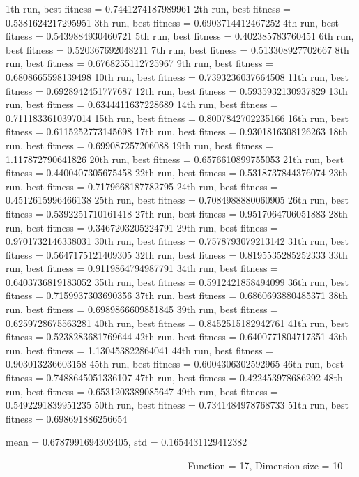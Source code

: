 1th run, best fitness = 0.7441274187989961
2th run, best fitness = 0.5381624217295951
3th run, best fitness = 0.6903714412467252
4th run, best fitness = 0.5439884930460721
5th run, best fitness = 0.402385783760451
6th run, best fitness = 0.520367692048211
7th run, best fitness = 0.513308927702667
8th run, best fitness = 0.6768255112725967
9th run, best fitness = 0.6808665598139498
10th run, best fitness = 0.7393236037664508
11th run, best fitness = 0.6928942451777687
12th run, best fitness = 0.5935932130937829
13th run, best fitness = 0.6344411637228689
14th run, best fitness = 0.7111833610397014
15th run, best fitness = 0.8007842702235166
16th run, best fitness = 0.6115252773145698
17th run, best fitness = 0.9301816308126263
18th run, best fitness = 0.699087257206088
19th run, best fitness = 1.117872790641826
20th run, best fitness = 0.6576610899755053
21th run, best fitness = 0.4400407305675458
22th run, best fitness = 0.5318737844376074
23th run, best fitness = 0.7179668187782795
24th run, best fitness = 0.4512615996466138
25th run, best fitness = 0.7084988880060905
26th run, best fitness = 0.5392251710161418
27th run, best fitness = 0.9517064706051883
28th run, best fitness = 0.3467203205224791
29th run, best fitness = 0.9701732146338031
30th run, best fitness = 0.7578793079213142
31th run, best fitness = 0.5647175121409305
32th run, best fitness = 0.8195535285252333
33th run, best fitness = 0.9119864794987791
34th run, best fitness = 0.6403736819183052
35th run, best fitness = 0.5912421858494099
36th run, best fitness = 0.7159937303690356
37th run, best fitness = 0.6860693880485371
38th run, best fitness = 0.6989866609851845
39th run, best fitness = 0.6259728675563281
40th run, best fitness = 0.8452515182942761
41th run, best fitness = 0.5238283681769644
42th run, best fitness = 0.6400771804717351
43th run, best fitness = 1.130453822864041
44th run, best fitness = 0.903013236603158
45th run, best fitness = 0.6004306302592965
46th run, best fitness = 0.7488645051336107
47th run, best fitness = 0.422453978686292
48th run, best fitness = 0.6531203389085647
49th run, best fitness = 0.5492291839951235
50th run, best fitness = 0.7341484978768733
51th run, best fitness = 0.698691886256654

mean = 0.6787991694303405, std = 0.1654431129412382

-------------------------------------------------------
Function = 17, Dimension size = 10

